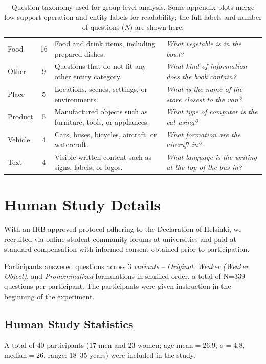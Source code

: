 \documentclass[letterpaper]{article} %
\begin{document}
\begin{table}[b]
{\begin{tabularx}{\textwidth}{@{}p{}cXp{}@{}}
Food        & 16 & Food and drink items, including prepared dishes. & \textit{What vegetable is in the bowl?} \\
Other       & 9  & Questions that do not fit any other entity category. & \textit{What kind of information does the book contain?} \\
Place       & 5  & Locations, scenes, settings, or environments. & \textit{What is the name of the store closest to the van?} \\
Product     & 5  & Manufactured objects such as furniture, tools, or appliances. & \textit{What type of computer is the cat using?} \\
Vehicle     & 4  & Cars, buses, bicycles, aircraft, or watercraft. & \textit{What formation are the aircraft in?} \\
Text        & 4  & Visible written content such as signs, labels, or logos. & \textit{What language is the writing at the top of the bus in?} \\
\bottomrule
\end{tabularx}
}
\caption{Question taxonomy used for group-level analysis. Some appendix plots merge low-support operation and entity labels for readability; the full labels and number of questions (\textit{N}) are shown here.}
\label{tab:taxonomy}
\end{table}

\clearpage
\section{Human Study Details}
\label{app:human_study}
With an IRB-approved protocol adhering to the Declaration of Helsinki, we recruited via online student community forums at universities and paid at standard compensation with informed consent obtained prior to participation.

Participants answered questions across 3 \textit{variants }-- \textit{Original}, \textit{Weaker (Weaker Object)}, and \textit{Pronominalized} formulations in shuffled order, a total of N{=}339 questions per participant. The participants were given instruction in the beginning of the experiment. %

\subsection{Human Study Statistics}
A total of 40 participants (17 men and 23 women; age mean${=}26.9$, $\sigma{=}4.8$, median${=}26$, range: 18--35 years) were included in the study.
\end{document}
